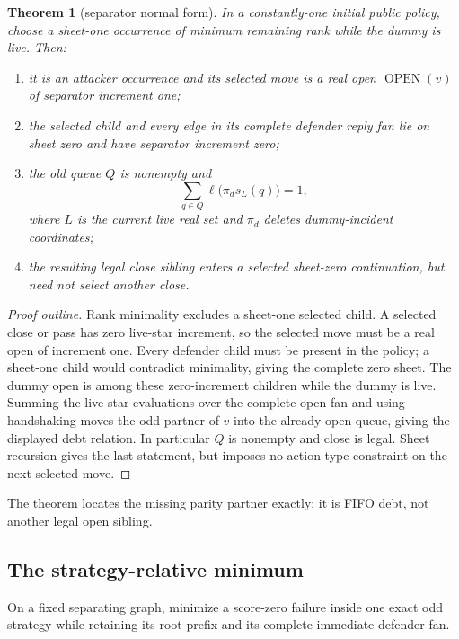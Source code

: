 \documentclass[11pt]{article}
\newtheorem{theorem}{Theorem}[section]
\theoremstyle{definition}
\theoremstyle{remark}
\begin{document}
\begin{theorem}[separator normal form]\label{thm:separator}
In a constantly-one initial public policy, choose a sheet-one occurrence of
minimum remaining rank while the dummy is live.  Then:
\begin{enumerate}
\item it is an attacker occurrence and its selected move is a real open
      $\operatorname{OPEN}(v)$ of separator increment one;
\item the selected child and every edge in its complete defender reply fan
      lie on sheet zero and have separator increment zero;
\item the old queue $Q$ is nonempty and
      \[
        \sum_{q\in Q}\ell\bigl(\pi_d s_L(q)\bigr)=1,
      \]
      where $L$ is the current live real set and $\pi_d$ deletes
      dummy-incident coordinates;
\item the resulting legal close sibling enters a selected sheet-zero
      continuation, but need not select another close.
\end{enumerate}
\end{theorem}

\begin{proof}[Proof outline]
Rank minimality excludes a sheet-one selected child.  A selected close or
pass has zero live-star increment, so the selected move must be a real open
of increment one.  Every defender child must be present in the policy; a
sheet-one child would contradict minimality, giving the complete zero sheet.
The dummy open is among these zero-increment children while the dummy is
live.  Summing the live-star evaluations over the complete open fan and using
handshaking moves the odd partner of $v$ into the already open queue, giving
the displayed debt relation.  In particular $Q$ is nonempty and close is legal.  Sheet
recursion gives the last statement, but imposes no action-type constraint on
the next selected move.
\end{proof}

The theorem locates the missing parity partner exactly: it is FIFO debt,
not another legal open sibling.

\subsection{The strategy-relative minimum}

On a fixed separating graph, minimize a score-zero failure inside one exact
odd strategy while retaining its root prefix and its complete immediate
defender fan.
\end{document}
